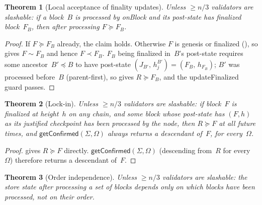 \documentclass{article}
\newcommand{\onBlock}{\textsf{onBlock}\xspace}
\newcommand{\updateFinalized}{\textsf{updateFinalized}\xspace}
\newcommand{\getConfirmed}{\textsf{getConfirmed}\xspace}
\theoremstyle{plain}
\newtheorem{theorem}{Theorem}
\theoremstyle{definition}
\theoremstyle{remark}
\begin{document}
\begin{theorem}[Local acceptance of finality updates]\label{thm:finlive}
Unless $\geq n/3$ validators are slashable: if a block~$B$ is processed by \onBlock and its post-state has finalized block~$F_B$, then after processing $F \succeq F_B$.
\end{theorem}

\begin{proof}
If $F \succeq F_B$ already, the claim holds.
Otherwise $F$ is genesis or finalized (), so  gives $F \sim F_B$ and hence $F \prec F_B$.
$F_B$ being finalized in~$B$'s post-state requires some ancestor~$B' \preceq B$ to have post-state $(J_{B'},\, h_j^{B'}) = (F_B,\, h_{F_B})$; $B'$ was processed before~$B$ (parent-first), so  gives $R \succeq F_B$, and the \updateFinalized guard passes.
\end{proof}

\begin{theorem}[Lock-in]\label{thm:lockin}
Unless $\geq n/3$ validators are slashable: if block~$F$ is finalized at height~$h$ on any chain, and some block whose post-state has $(F, h)$ as its justified checkpoint has been processed by the node, then $R \succeq F$ at all future times, and $\getConfirmed(\Sigma, \Omega)$ always returns a descendant of~$F$, for every~$\Omega$.
\end{theorem}

\begin{proof}
 gives $R \succeq F$ directly.
$\getConfirmed(\Sigma, \Omega)$ (descending from~$R$ for every~$\Omega$) therefore returns a descendant of~$F$.
\end{proof}

\begin{theorem}[Order independence]\label{thm:orderindep}
Unless $\geq n/3$ validators are slashable: the store state after processing a set of blocks depends only on which blocks have been processed, not on their order.
\end{theorem}
\end{document}
